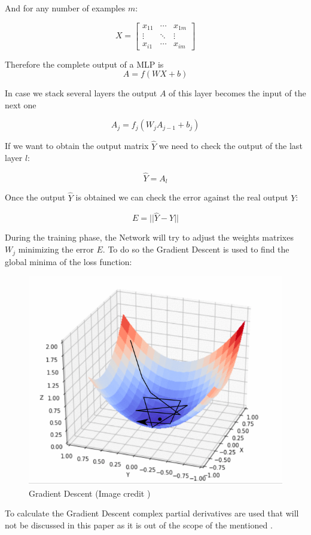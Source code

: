 And for any number of examples $m$:

$$
X=\left[
\begin{array}{ccc}
   x_{11} & \cdots & x_{1m} \\
   \vdots & \ddots & \vdots \\
   x_{i1} & \cdots & x_{im}
\end{array}
\right]
$$

Therefore the complete output of a MLP is
$$ A = f(WX + b) $$


In case we stack several layers the output $A$ of this layer becomes the input of the next one

$$ A_j = f_j(W_jA_{j-1} + b_j) $$

If we want to obtain the output matrix $\hat{Y}$ we need to check the output of the last layer $l$:

$$ \hat{Y} = A_l $$

Once the output $\hat{Y}$ is obtained we can check the error against the real output $Y$:

$$ E = || \hat{Y} - Y || $$

During the training phase, the Network will try to adjust the weights matrixes $W_j$ minimizing the error $E$.
To do so the Gradient Descent is used to find the global minima of the loss function:

\begin{figure}[th]
    \centering
    \includegraphics[width=1.0\textwidth]{Figures/GDescent.png}
    \decoRule
    \caption[Gradient Descent]{Gradient Descent (Image credit \cite{mathann})}
    \label{fig:Gradient Descent}
\end{figure}

To calculate the Gradient Descent complex partial derivatives are used that will not be discussed in this paper as it is out of the scope of the mentioned \cite{Suykens1996} \cite{Werbos1990}.